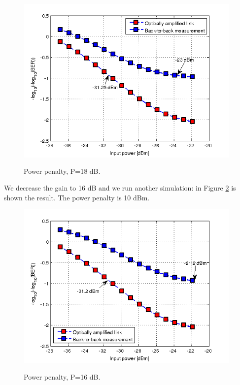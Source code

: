 \documentclass[a4paper,10pt]{report}
\begin{document}
\begin{figure}[!ht]
   \centering
   \includegraphics[width=11cm]{ex7_penalty18dB.png}\\
   \caption{Power penalty, P=18 dB.}
   \label{ex7_penalty18dB}
\end{figure}

We decrease the gain to 16 dB and we run another simulation: in Figure \ref{ex7_penalty16dB} is shown the result.
The power penalty is 10 dBm.

\begin{figure}[!ht]
   \centering
   \includegraphics[width=11cm]{ex7_penalty16dB.png}\\
   \caption{Power penalty, P=16 dB.}
   \label{ex7_penalty16dB}
\end{figure}
\end{document}
